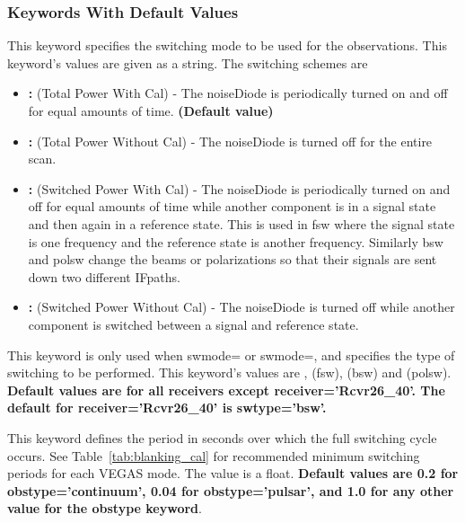 \subsubsection{Keywords With Default Values}
\begin{description}[font=\bfseries\large,leftmargin=*,align=right]

\item[swmode] This keyword specifies the switching mode to be used for the
observations.  This keyword's values are given as a string.
The switching schemes are
\begin{itemize}
\item {\bf {}: } (Total Power With Cal) - The \gls{noiseDiode} is
periodically turned on and off for equal amounts of time. {\bf (Default value)}
\item {\bf {}: } (Total Power Without Cal) - The \gls{noiseDiode}
is turned off for the entire scan.
\item {\bf {}: } (Switched Power With Cal) - The \gls{noiseDiode} is
periodically turned on and off for equal amounts of time while another
component is in a signal state and then again in a reference state.  This is
used in \gls{fsw} where the signal state is one frequency and the reference
state is another frequency.  Similarly \gls{bsw} and \gls{polsw} change the
beams or polarizations so that their signals are sent down two different
\glspl{IFpath}.
\item {\bf {}: } (Switched Power Without Cal) - The
\gls{noiseDiode} is turned off while another component is switched between
a signal and reference state.
\end{itemize}

\item[swtype] This keyword is only used when swmode= or
swmode=,  and specifies the type of switching to be performed. 
This keyword's values are ,  (\gls{fsw}),  
(\gls{bsw}) and  (\gls{polsw}). {\bf Default values
are  for all receivers except receiver='Rcvr26\_40'.
The default for receiver='Rcvr26\_40' is swtype='bsw'.} 

\item[swper] This keyword defines the period in seconds  over which the full
switching cycle occurs. See Table~\ref{tab:blanking_cal} for recommended
minimum switching periods for each \gls{VEGAS} mode.  The value is a float.
{\bf Default values are 0.2 for obstype='continuum', 0.04 for
obstype='pulsar', and 1.0 for any other value for the obstype keyword}. 


\end{description}
